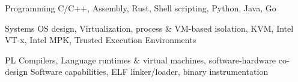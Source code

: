 


\begin{cvskills}



\cvskill
{Programming} %
{C/C++, Assembly, Rust, Shell scripting, Python, Java, Go} %



\cvskill
  {Systems}
  {OS design, Virtualization, process \& VM-based isolation, KVM, Intel VT-x, Intel MPK, Trusted Execution Environments}

\cvskill
  {PL}
  {Compilers, Language runtimes \& virtual machines, software-hardware co-design\linebreak
  Software capabilities, ELF linker/loader, binary instrumentation
  }


\end{cvskills}
